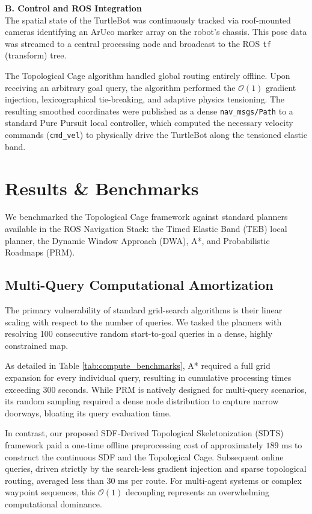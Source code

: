 \documentclass[letterpaper, 10 pt, conference]{IEEEtran}
\begin{document}
\textbf{B. Control and ROS Integration} \\
The spatial state of the TurtleBot was continuously tracked via roof-mounted cameras identifying an ArUco marker array on the robot's chassis. This pose data was streamed to a central processing node and broadcast to the ROS \texttt{tf} (transform) tree. 

The Topological Cage algorithm handled global routing entirely offline. Upon receiving an arbitrary goal query, the algorithm performed the $\mathcal{O}(1)$ gradient injection, lexicographical tie-breaking, and adaptive physics tensioning. The resulting smoothed coordinates were published as a dense \texttt{nav\_msgs/Path} to a standard Pure Pursuit local controller, which computed the necessary velocity commands (\texttt{cmd\_vel}) to physically drive the TurtleBot along the tensioned elastic band.

\section{Results \& Benchmarks}
We benchmarked the Topological Cage framework against standard planners available in the ROS Navigation Stack: the Timed Elastic Band (TEB) local planner, the Dynamic Window Approach (DWA), A*, and Probabilistic Roadmaps (PRM).

\subsection{Multi-Query Computational Amortization}
The primary vulnerability of standard grid-search algorithms is their linear scaling with respect to the number of queries. We tasked the planners with resolving 100 consecutive random start-to-goal queries in a dense, highly constrained map. 

As detailed in Table \ref{tab:compute_benchmarks}, A* required a full grid expansion for every individual query, resulting in cumulative processing times exceeding 300 seconds. While PRM is natively designed for multi-query scenarios, its random sampling required a dense node distribution to capture narrow doorways, bloating its query evaluation time.

In contrast, our proposed SDF-Derived Topological Skeletonization (SDTS) framework paid a one-time offline preprocessing cost of approximately $189$ ms to construct the continuous SDF and the Topological Cage. Subsequent online queries, driven strictly by the search-less gradient injection and sparse topological routing, averaged less than $30$ ms per route. For multi-agent systems or complex waypoint sequences, this $\mathcal{O}(1)$ decoupling represents an overwhelming computational dominance.
\end{document}
